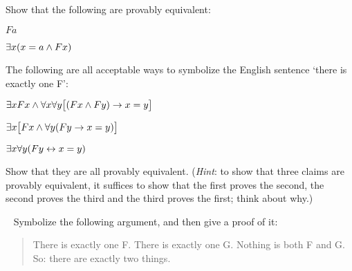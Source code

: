\problempart
Show that the following are provably equivalent:
\begin{ebullet}
\item $Fa$
\item $\exists x(x = a \wedge Fx)$
\end{ebullet}


\problempart
The following are all acceptable ways to symbolize the English sentence `there is exactly one F':
\begin{ebullet}
\item $\exists x Fx \wedge \forall x \forall y \bigl[(Fx \wedge Fy) \rightarrow x = y\bigr]$
\item $\exists x \bigl[Fx \wedge \forall y (Fy \rightarrow x = y)\bigr]$
\item $\exists x \forall y (Fy \leftrightarrow x = y)$
\end{ebullet}
Show that they are all provably equivalent. (\emph{Hint}: to show that three claims are provably equivalent, it suffices to show that the first proves the second, the second proves the third and the third proves the first; think about why.)


\
\problempart
Symbolize the following argument, and then give a proof of it:
	\begin{quote}
		There is exactly one F. There is exactly one G. Nothing is both F and G. So: there are exactly two things.%
	\end{quote}





